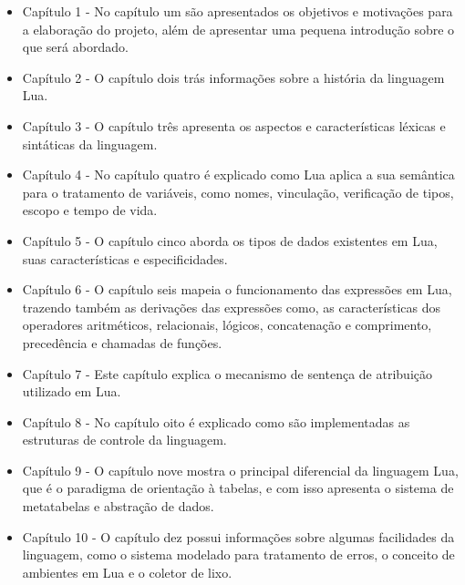 \documentclass[
12pt, %
openright, %
oneside, %
a4paper, %
english, %
brazil, %
]{abntex2}
\begin{document}
\begin{itemize}

\item Capítulo 1 - No capítulo um são apresentados os objetivos e motivações para a elaboração do projeto, além de apresentar uma pequena introdução sobre o que será abordado.

\item Capítulo 2 - O capítulo dois trás informações sobre a história da linguagem Lua.

\item Capítulo 3 - O capítulo três apresenta os aspectos e características léxicas e sintáticas da linguagem.

\item Capítulo 4 - No capítulo quatro é explicado como Lua aplica a sua semântica para o tratamento de variáveis, como nomes, vinculação, verificação de tipos, escopo e tempo de vida.

\item Capítulo 5 - O capítulo cinco aborda os tipos de dados existentes em Lua, suas características e especificidades.

\item Capítulo 6 - O capítulo seis mapeia o funcionamento das expressões em Lua, trazendo também as derivações das expressões como, as características dos operadores aritméticos, relacionais, lógicos, concatenação e comprimento, precedência e chamadas de funções.

\item Capítulo 7 - Este capítulo explica o mecanismo de sentença de atribuição utilizado em Lua.

\item Capítulo 8 - No capítulo oito é explicado como são implementadas as estruturas de controle da linguagem. 

\item Capítulo 9 - O capítulo nove mostra o principal diferencial da linguagem Lua, que é o paradigma de orientação à tabelas, e com isso apresenta o sistema de metatabelas e abstração de dados.

\item Capítulo 10 - O capítulo dez possui informações sobre algumas facilidades da linguagem, como o sistema modelado para tratamento de erros, o conceito de ambientes em Lua e o coletor de lixo.

\end{itemize}


\end{document}

